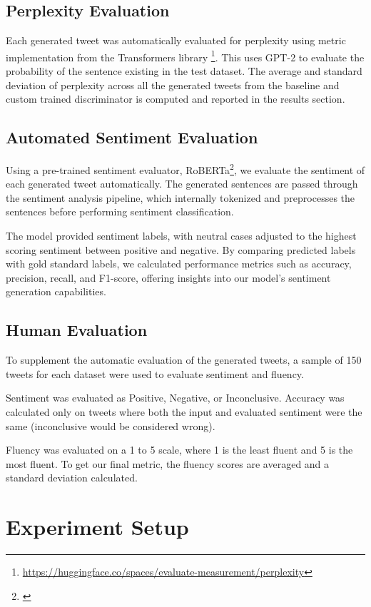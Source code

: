 \documentclass[11pt]{article}
\begin{document}
\subsection{Perplexity Evaluation}
Each generated tweet was automatically evaluated for perplexity using metric implementation from the Transformers library \footnote{\url{https://huggingface.co/spaces/evaluate-measurement/perplexity}}. This uses GPT-2 to evaluate the probability of the sentence existing in the test dataset. The average and standard deviation of perplexity across all the generated tweets from the baseline and custom trained discriminator is computed and reported in the results section.

\subsection{Automated Sentiment Evaluation}
Using a pre-trained sentiment evaluator, RoBERTa\footnote{\citep{roberta-huggingface}}, we evaluate the sentiment of each generated tweet automatically. The generated sentences are passed through the sentiment analysis pipeline, which internally tokenized and preprocesses the sentences before performing sentiment classification. 

The model provided sentiment labels, with neutral cases adjusted to the highest scoring sentiment between positive and negative. By comparing predicted labels with gold standard labels, we calculated performance metrics such as accuracy, precision, recall, and F1-score, offering insights into our model's sentiment generation capabilities.

\subsection{Human Evaluation}
To supplement the automatic evaluation of the generated tweets, a sample of 150 tweets for each dataset were used to evaluate sentiment and fluency.  

Sentiment was evaluated as Positive, Negative, or Inconclusive.  Accuracy was calculated only on tweets where both the input and evaluated sentiment were the same (inconclusive would be considered wrong).  

Fluency was evaluated on a 1 to 5 scale, where 1 is the least fluent and 5 is the most fluent. To get our final metric, the fluency scores are averaged and a standard deviation calculated.


\section{Experiment Setup}
\end{document}
